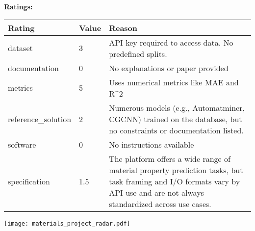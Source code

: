 {{{\bf Ratings:} ~ \\

\begin{tabular}{p{} p{} p{}}
\hline
Rating & Value & Reason \\
\hline
dataset & 3 & API key required to access data. No predefined splits.
 \\
documentation & 0 & No explanations or paper provided
 \\
metrics & 5 & Uses numerical metrics like MAE and R^2
 \\
reference\_solution & 2 & Numerous models (e.g., Automatminer, CGCNN) trained on the database, but no constraints or documentation listed.
 \\
software & 0 & No instructions available
 \\
specification & 1.5 & The platform offers a wide range of material property prediction tasks, but task framing and I/O formats vary by API use and are not always standardized across use cases.
 \\
\hline
\end{tabular}

\texttt{[image: materials\_project\_radar.pdf]}
}}
\clearpage